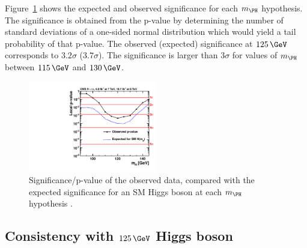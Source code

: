 Figure~\ref{fig:results-pvalue} shows the expected and observed significance for
each $m_{\PH}$ hypothesis. The significance is obtained from the p-value by
determining the number of standard deviations of a one-sided normal distribution
which would yield a tail probability of that p-value. The observed (expected)
significance at $125\,\GeV$ corresponds to $3.2\sigma$ ($3.7\sigma$). The
significance is larger than $3\sigma$ for values of $m_{\PH}$ between $115\,\GeV$
and $130\,\GeV$.

\begin{figure}[h!]
\includegraphics[width=0.5\textwidth]{plots/htt-sm/cmb_p-value.pdf}
\caption[Significance/p-value of the observed data, compared with the expected
significance for an SM Higgs boson at each $m_{\PH}$ hypothesis.]
{Significance/p-value of the observed data, compared with the expected
significance for an \ac{SM} Higgs boson at each $m_{\PH}$ hypothesis
\cite{HIG-13-004}.}
\label{fig:results-pvalue}
\end{figure}

\subsection{Consistency with $125\,\GeV$ Higgs boson}
\label{sec:consistency}

